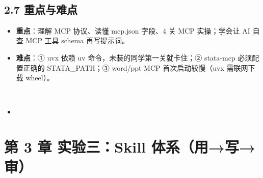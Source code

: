 \documentclass[
  american,
  chinese,
]{ctexart}
\providecommand{\tightlist}{%
  \setlength{\itemsep}{0pt}\setlength{\parskip}{0pt}}
\begin{document}
\foreignlanguage{american}{}

~

\subsection{\texorpdfstring{\foreignlanguage{american}{2.7 }{\foreignlanguage{american}{重点与难点}}}{2.7 重点与难点}}\label{ux91cdux70b9ux4e0eux96beux70b9}

\begin{itemize}
\tightlist
\item
  \textbf{{重点}}{：理解}\foreignlanguage{american}{ MCP }{协议、读懂}\foreignlanguage{american}{ {mcp.json}
  }{字段、}\foreignlanguage{american}{4 }{关}\foreignlanguage{american}{ MCP }{实操；学会让}\foreignlanguage{american}{ AI }{自查}\foreignlanguage{american}{ MCP }{工具}\foreignlanguage{american}{ schema }{再写提示词。}\foreignlanguage{american}{}
\item
  {\textbf{\foreignlanguage{american}{难点}}}\foreignlanguage{american}{：}\foreignlanguage{american}{① {uvx} }{\foreignlanguage{american}{依赖}}\foreignlanguage{american}{ {uv} }{\foreignlanguage{american}{命令，未装的同学第一关就卡住}}\foreignlanguage{american}{；}\foreignlanguage{american}{② {stata-mcp} }{\foreignlanguage{american}{必须配置正确的}}\foreignlanguage{american}{ STATA\_PATH}\foreignlanguage{american}{；}\foreignlanguage{american}{③ word/ppt MCP }{\foreignlanguage{american}{首次启动较慢（}\foreignlanguage{american}{uvx}}\foreignlanguage{american}{ }{\foreignlanguage{american}{需联网下载}}\foreignlanguage{american}{ wheel}\foreignlanguage{american}{）。}
\end{itemize}

\foreignlanguage{american}{\hfill\break
}

\foreignlanguage{american}{}

~

\begin{itemize}
\item
  \foreignlanguage{american}{}

  ~
\end{itemize}

\clearpage

\section{\texorpdfstring{{第}\foreignlanguage{american}{ 3 }{章}{ }{实验三：}\foreignlanguage{american}{Skill }{体系（用}\foreignlanguage{american}{→}{写}\foreignlanguage{american}{→}{审）}\foreignlanguage{american}{}}{第 3 章 实验三：Skill 体系（用→写→审）}}\label{ux7b2c-3-ux7ae0-ux5b9eux9a8cux4e09skill-ux4f53ux7cfb}
\end{document}
